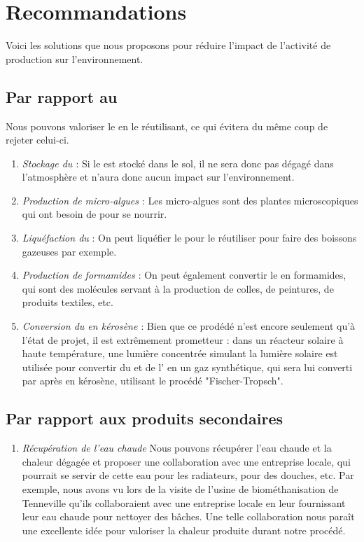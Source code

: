\documentclass[a4paper, oneside]{scrartcl}
\begin{document}
\section{Recommandations \cite{evaleco} \cite{lossprev}}
Voici les solutions que nous proposons pour réduire l'impact de l'activité de production sur l'environnement.
\subsection{Par rapport au \texorpdfstring{}{CO \texttwoinferior}}
Nous pouvons valoriser le  en le réutilisant, ce qui évitera du même coup de rejeter celui-ci.
\begin{enumerate}
\item \emph{Stockage du   \cite{capt} \cite{capt2}} : Si le  est stocké dans le sol, il ne sera donc pas dégagé dans l'atmosphère et n'aura donc aucun impact sur l'environnement. 
\item \emph{Production de micro-algues \cite{algues}} : Les micro-algues sont des plantes microscopiques qui ont besoin de  pour se nourrir. 
\item \emph{Liquéfaction du } : On peut liquéfier le  pour le réutiliser pour faire des boissons gazeuses par exemple. 
\item \emph{Production de formamides \cite{sol1} \cite{sol2}} : On peut également convertir le  en formamides, qui sont des molécules servant à la production de colles, de peintures, de produits textiles, etc.
\item \emph{Conversion du  en kérosène \cite{sol3} \cite{sol4}} : Bien que ce prodédé n'est encore seulement qu'à l'état de projet, il est extrêmement prometteur : dans un réacteur solaire à haute température, une lumière concentrée simulant la lumière solaire est utilisée pour convertir du  et de l' en un gaz synthétique, qui sera lui converti par après en kérosène, utilisant le procédé "Fischer-Tropsch".
\end{enumerate}
\subsection{Par rapport aux produits secondaires}
\begin{enumerate}
\item \emph{Récupération de l'eau chaude} Nous pouvons récupérer l'eau chaude et la chaleur dégagée et proposer une collaboration avec une entreprise locale, qui pourrait se servir de cette eau pour les radiateurs, pour des douches, etc. Par exemple, nous avons vu lors de la visite de l'usine de biométhanisation de Tenneville qu'ils collaboraient avec une entreprise locale en leur fournissant leur eau chaude pour nettoyer des bâches. Une telle collaboration nous paraît une excellente idée pour valoriser la chaleur produite durant notre procédé.
\end{enumerate}

\printbibliography[heading=bibintoc]
\end{document}
